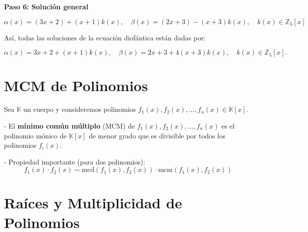 \documentclass[a4paper,12pt]{article}
\begin{document}
\begin{ejemplo}[title=Resolución de una ecuación diofántica en $\mathbb{Z}_5$]

\textbf{Paso 6: Solución general}

\[
\alpha(x) = (3x+2) + (x+1) k(x), \quad
\beta(x) = (2x+3) - (x+3) k(x), \quad k(x) \in \mathbb{Z}_5[x]
\]

Así, todas las soluciones de la ecuación diofántica están dadas por:

\[
\alpha(x) = 3x+2+(x+1)k(x), \quad
\beta(x) = 2x+3+4(x+3)k(x), \quad k(x) \in \mathbb{Z}_5[x].
\]
\end{ejemplo}

\section{MCM de Polinomios}

\begin{procedimiento}[title=Mínimo común múltiplo de polinomios]
Sea \(\mathbb{K}\) un cuerpo y consideremos polinomios \(f_1(x), f_2(x), \dots, f_n(x) \in \mathbb{K}[x]\).

- El \textbf{mínimo común múltiplo} (MCM) de \(f_1(x), f_2(x), \dots, f_n(x)\) es el polinomio mónico de \(\mathbb{K}[x]\) de menor grado que es divisible por todos los polinomios \(f_i(x)\).

\bigskip

- Propiedad importante (para dos polinomios):
\[
f_1(x) \cdot f_2(x) \sim \text{mcd}(f_1(x),f_2(x)) \cdot \text{mcm}(f_1(x),f_2(x))
\]
\end{procedimiento}

\section{Raíces y Multiplicidad de Polinomios}
\end{document}
